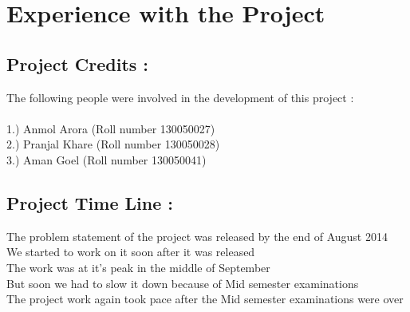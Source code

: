 \documentclass{article}
\begin{document}
\section{Experience with the Project}
\subsection*{Project Credits : }
\hspace*{5 mm}The following people were involved in the development of this project : \\
\\
\hspace*{10 mm}1.) Anmol Arora (Roll number 130050027) \\
\hspace*{10 mm}2.) Pranjal Khare (Roll number 130050028) \\
\hspace*{10 mm}3.) Aman Goel (Roll number 130050041) \\
\subsection*{Project Time Line : }
\hspace*{5 mm}The problem statement of the project was released by the end of August 2014 \\
\hspace*{5 mm}We started to work on it soon after it was released \\
\hspace*{5 mm}The work was at it's peak in the middle of September \\
\hspace*{5 mm}But soon we had to slow it down because of Mid semester examinations \\
\hspace*{5 mm}The project work again took pace after the Mid semester examinations were over \\
\end{document}
